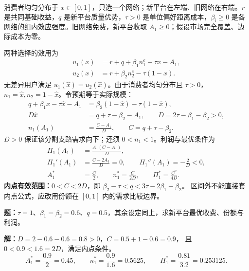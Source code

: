 \documentclass[12pt,a4paper,fontset=none]{ctexart}
\begin{document}
消费者均匀分布于 $x\in[0,1]$，只选一个网络；新平台在左端、旧网络在右端。$r$ 是共同基础收益，$q$ 是新平台质量优势，$\tau>0$ 是单位偏好距离成本，$\beta_i\ge0$ 是各网络的组内效应强度。旧网络免费，新平台收取 $A_1\ge0$；假设市场完全覆盖、边际成本为零。
\begin{proofbox}[title=需求与利润的推导]
两种选择的效用为
\begin{align*}
u_1(x)&=r+q+\beta_1n_1^e-\tau x-A_1,\\
u_2(x)&=r+\beta_2n_2^e-\tau(1-x).
\end{align*}
无差异用户满足 $u_1(\hat x)=u_2(\hat x)$。由于消费者均匀分布且 $\tau>0$，$n_1=\hat x,n_2=1-\hat x$。令预期等于实际规模：
\begin{align*}
q+\beta_1\hat x-\tau\hat x-A_1
  &=\beta_2(1-\hat x)-\tau(1-\hat x),\\
D\hat x&=q+\tau-\beta_2-A_1,\qquad D=2\tau-\beta_1-\beta_2>0,\\
n_1(A_1)&=\frac{C-A_1}{D},\qquad C=q+\tau-\beta_2.
\end{align*}
$D>0$ 保证该分割支路需求向下；还须 $0<n_1<1$。利润与最优条件为
\begin{align*}
\Pi_1(A_1)&=\frac{A_1(C-A_1)}D,\\
\Pi_1'(A_1)&=\frac{C-2A_1}D=0,\qquad
\Pi_1''(A_1)=-\frac2D<0,\\
A_1^*&=\frac C2,\qquad n_1^*=\frac C{2D},\qquad
\Pi_1^*=\frac{C^2}{4D}.
\end{align*}
\textbf{内点有效范围：}$0<C<2D$，即
$\beta_2-\tau<q<3\tau-2\beta_1-\beta_2$。
区间外不能直接套内点公式，应改用份额在 $[0,1]$ 内的需求比较边界。
\end{proofbox}
\begin{examplebox}[title=例题]
\textbf{题：}$\tau=1$、$\beta_1=\beta_2=0.6$、$q=0.5$，其余设定同上，求新平台最优收费、份额与利润。

\textbf{解：}$D=2-0.6-0.6=0.8>0$，$C=0.5+1-0.6=0.9$，
且 $0<0.9<1.6=2D$，满足内点条件。
\[
A_1^*=\frac{0.9}{2}=0.45,\qquad
n_1^*=\frac{0.9}{1.6}=0.5625,\qquad
\Pi_1^*=\frac{0.81}{3.2}=0.253125.
\]
\end{examplebox}
\end{document}
